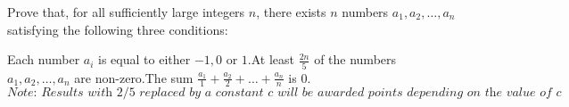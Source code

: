Prove that, for all sufficiently large integers $n$,  there exists $n$ numbers $a_1, a_2, \dots, a_n$ satisfying the following three conditions:

Each number $a_i$ is equal to either $-1, 0$ or $1$.At least $\frac{2n}{5}$ of the numbers $a_1, a_2, \dots, a_n$ are non-zero.The sum $\frac{a_1}{1} + \frac{a_2}{2} + \dots + \frac{a_n}{n}$ is $0$.$\textit{Note: Results with 2/5 replaced by a constant } c \textit{ will be awarded points depending on the value of } c$
